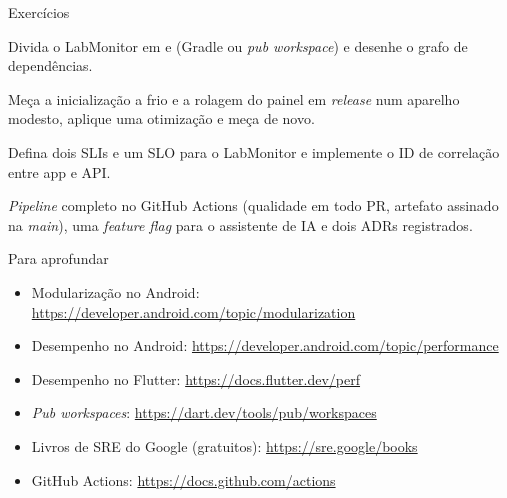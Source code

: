 \documentclass[aspectratio=169,10pt]{beamer}
\begin{document}
\begin{frame}{Exercícios}
  \begin{exercicio}
    Divida o LabMonitor em  e  (Gradle ou \emph{pub workspace}) e desenhe o grafo de dependências.
  \end{exercicio}
  \begin{exercicio}
    Meça a inicialização a frio e a rolagem do painel em \emph{release} num aparelho modesto, aplique uma otimização e meça de novo.
  \end{exercicio}
  \begin{exercicio}
    Defina dois SLIs e um SLO para o LabMonitor e implemente o ID de correlação entre app e API.
  \end{exercicio}
  \begin{projeto}
    \emph{Pipeline} completo no GitHub Actions (qualidade em todo PR, artefato assinado na \emph{main}), uma \emph{feature flag} para o assistente de IA e dois ADRs registrados.
  \end{projeto}
\end{frame}

\begin{frame}{Para aprofundar}
  \small
  \begin{itemize}
    \item Modularização no Android: \url{https://developer.android.com/topic/modularization}
    \item Desempenho no Android: \url{https://developer.android.com/topic/performance}
    \item Desempenho no Flutter: \url{https://docs.flutter.dev/perf}
    \item \emph{Pub workspaces}: \url{https://dart.dev/tools/pub/workspaces}
    \item Livros de SRE do Google (gratuitos): \url{https://sre.google/books}
    \item GitHub Actions: \url{https://docs.github.com/actions}
  \end{itemize}
\end{frame}
\end{document}
